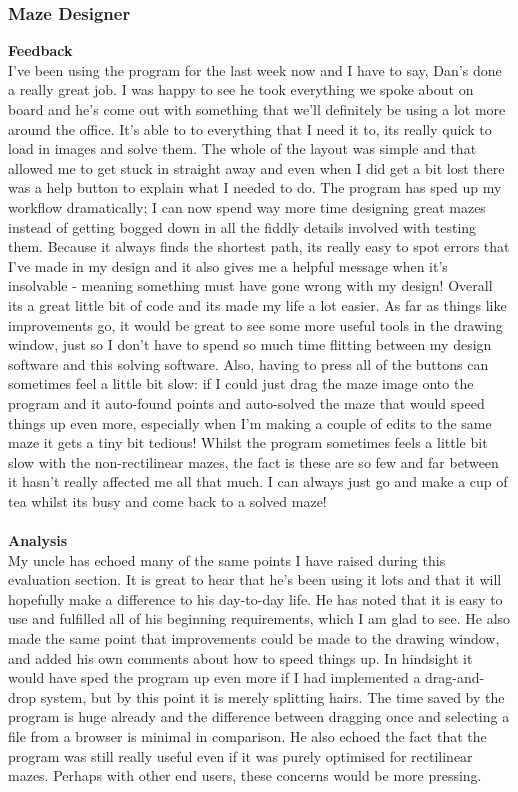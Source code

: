 \documentclass[titlepage]{article}
\begin{document}
\subsubsection{Maze Designer}
\textbf{Feedback}\\
I've been using the program for the last week now and I have to say, Dan's done a really great job. I was happy to see he took everything we spoke about on board and he's come out with something that we'll definitely be using a lot more around the office. It's able to to everything that I need it to, its really quick to load in images and solve them. The whole of the layout was simple and that allowed me to get stuck in straight away and even when I did get a bit lost there was a help button to explain what I needed to do. The program has sped up my workflow dramatically; I can now spend way more time designing great mazes instead of getting bogged down in all the fiddly details involved with testing them. Because it always finds the shortest path, its really easy to spot errors that I've made in my design and it also gives me a helpful message when it's insolvable - meaning something must have gone wrong with my design! Overall its a great little bit of code and its made my life a lot easier. As far as things like improvements go, it would be great to see some more useful tools in the drawing window, just so I don't have to spend so much time flitting between my design software and this solving software. Also, having to press all of the buttons can sometimes feel a little bit slow: if I could just drag the maze image onto the program and it auto-found points and auto-solved the maze that would speed things up even more, especially when I'm making a couple of edits to the same maze it gets a tiny bit tedious! Whilst the program sometimes feels a little bit slow with the non-rectilinear mazes, the fact is these are so few and far between it hasn't really affected me all that much. I can always just go and make a cup of tea whilst its busy and come back to a solved maze!\\\\
\textbf{Analysis}\\
My uncle has echoed many of the same points I have raised during this evaluation section. It is great to hear that he's been using it lots and that it will hopefully make a difference to his day-to-day life. He has noted that it is easy to use and fulfilled all of his beginning requirements, which I am glad to see. He also made the same point that improvements could be made to the drawing window, and added his own comments about how to speed things up. In hindsight it would have sped the program up even more if I had implemented a drag-and-drop system, but by this point it is merely splitting hairs. The time saved by the program is huge already and the difference between dragging once and selecting a file from a browser is minimal in comparison. He also echoed the fact that the program was still really useful even if it was purely optimised for rectilinear mazes. Perhaps with other end users, these concerns would be more pressing.
\end{document}
